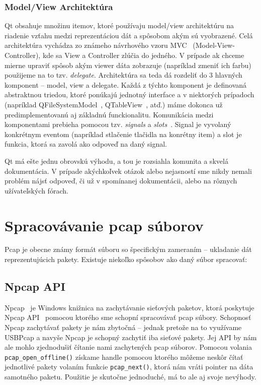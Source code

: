 \subsubsection*{Model/View Architektúra}
Qt obsahuje množinu itemov, ktoré používaju model/view architektúru na riadenie vzťahu medzi reprezentáciou dát a spôsobom akým sú vyobrazené. Celá architektúra vychádza zo známeho návrhového vzoru MVC~\cite{mvc} (Model-View-Controller), kde sa View a Controller zlúčia do jedného. V prípade ak chceme mierne upraviť spôsob akým viewer dáta zobrazuje (napríklad zmeniť ich farbu) použijeme na to tzv. \textit{delegate}. Architektúra sa teda dá rozdeliť do 3 hlavných komponent -- model, view a delegate. Každá z týchto komponent je definovaná abstraktnou triedou, ktoré ponúkajú jednotný interface a v niektorých prípadoch (napríklad QFileSystemModel~\cite{qfilesystemmodel}, QTableView~\cite{qtableview}, atď.) máme dokonca už predimplementovanú aj základnú funckionalitu. Komunikácia medzi komponentami prebieha pomocou tzv. \textit{signals} a \textit{slots}~\cite{signal_slot}. Signal je vyvolaný konkrétnym eventom (napríklad stlačenie tlačidla na konrétny item) a slot je funkcia, ktorá sa zavolá ako odpoveď na daný signal.

Qt má ešte jednu obrovskú výhodu, a tou je rozsiahla komunita a skvelá dokumentácia. V prípade akýchkoľvek otázok alebo nejasností sme nikdy nemali problém nájsť odpoveď, či už v spomínanej dokumentácii, alebo na rôznych užívateľských fórach.



\section{Spracovávanie pcap súborov}
Pcap je obecne známy formát súboru so špecifickým zameraním -- ukladanie dát reprezentujúcich pakety. Existuje niekoľko spôsobov ako daný súbor spracovať:

\subsection*{Npcap API}
Npcap~\cite{npcap} je Windows knižnica na zachytávanie sieťových paketov, ktorá poskytuje Npcap API~\cite{npcap_api} pomocou ktorého sme schopní spracovávať pcap súbory. Schopnosť Npcap zachytávať pakety je nám zbytočná -- jednak pretože na to využívame USBPcap a navyše Npcap je schopný zachytiť iba sieťové pakety. Jej API by nám ale mohlo zjednodušiť čítanie nami zachytených pcap súborov. Pomocou volania \texttt{pcap\_open\_offline()} získame handle pomocou ktorého môžeme neskôr čítať jednotlivé pakety volaním funkcie \texttt{pcap\_next()}, ktorá nám vráti pointer na dáta samotného paketu. Použitie je skutočne jednoduché, má to ale aj svoje nevýhody.


